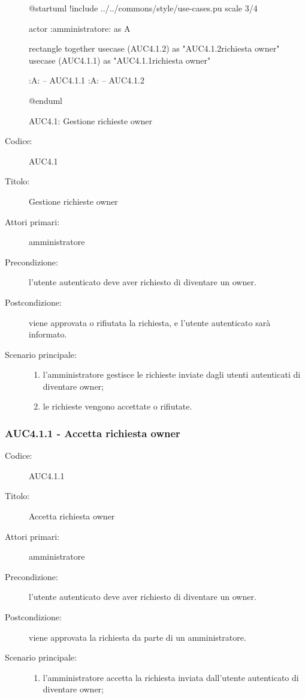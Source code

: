 \documentclass[casi-duso]{subfiles}
\begin{document}
\begin{figure}[h!] 
  \centering 
  \begin{plantuml}
  @startuml
  !include ../../commons/style/use-cases.pu
  scale 3/4

  actor :amministratore: as A

  rectangle {
    together {
      usecase (AUC4.1.2) as "AUC4.1.2\nRifiuta richiesta owner"
      usecase (AUC4.1.1) as "AUC4.1.1\nAccetta richiesta owner"
    }
  }

  :A: -- AUC4.1.1
  :A: -- AUC4.1.2

  @enduml
  \end{plantuml} 
  \caption{AUC4.1: Gestione richieste owner} 
  \label{fig:auc4_1} 
\end{figure}

\begin{description}
  \item[Codice:] AUC4.1
  \item[Titolo:] Gestione richieste owner
  \item[Attori primari:] amministratore
  \item[Precondizione:] l'utente autenticato deve aver richiesto di diventare un owner.
  \item[Postcondizione:] viene approvata o rifiutata la richiesta, e l'utente autenticato sarà informato.
  \item[Scenario principale:] 
  \begin{enumerate}
    \item l'amministratore gestisce le richieste inviate dagli utenti autenticati di diventare owner;
    \item le richieste vengono accettate o rifiutate.
  \end{enumerate}
\end{description}

\subsubsection{AUC4.1.1 - Accetta richiesta owner}%
\label{subsub:AUC4.1.1}
\begin{description}
  \item[Codice:] AUC4.1.1
  \item[Titolo:] Accetta richiesta owner
  \item[Attori primari:] amministratore
  \item[Precondizione:] l'utente autenticato deve aver richiesto di diventare un owner.
  \item[Postcondizione:] viene approvata la richiesta da parte di un amministratore.
  \item[Scenario principale:]
  \begin{enumerate}
    \item l'amministratore accetta la richiesta inviata dall'utente autenticato di diventare owner;
  \end{enumerate}
\end{description}
\end{document}
